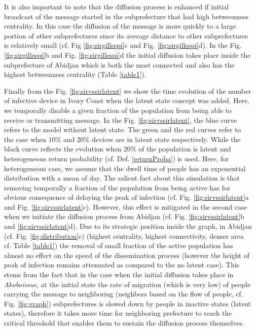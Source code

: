 \documentclass[review]{elsarticle}
\begin{document}
It is also important to note that the diffusion process is enhanced if initial broadcast of the message started in the subprefecture that had high betweenness centrality. In this case the diffusion of the message is more quickly to a large portion of other subprefectures since its average distance to other subprefectures is relatively small (cf. Fig \ref{fig:sirgillespi}c and Fig. \ref{fig:sirgillespi}d). In the Fig. \ref{fig:sirgillespi}b and Fig. \ref{fig:sirgillespi}d the initial diffusion takes place inside the subprefecture of Abidjan which is both the most connected and also has the highest betweenness centrality (Table \ref{table1}).  

Finally from the Fig. \ref{fig:sirvssirlatent} we show the time evolution of the number of infective device in Ivory Coast when the latent state concept was added. Here, we temporally disable a given fraction of the population from being able to receive or transmitting message. In the Fig. \ref{fig:sirvssirlatent}, the blue curve refers to the model without latent state. The green and the red curves refer to the case when 10\% and 20\% devices are in latent state respectively. While the black curve reflects the evolution when 20\% of the population is latent and heterogeneous return probability (cf. Def. \ref{returnProba}) is used. Here, for heterogeneous case, we assume that the dwell time of people has an exponential distribution with a mean of  day. The salient fact about this simulation is that removing temporally a fraction of the population from being active has for obvious consequence of delaying the peak of infection (cf. Fig. \ref{fig:sirvssirlatent}a and Fig. \ref{fig:sirvssirlatent}c). However, this effect is mitigated in the second case when we initiate the diffusion process from Abidjan (cf. Fig. \ref{fig:sirvssirlatent}b and \ref{fig:sirvssirlatent}d). Due to its strategic position inside the graph, in Abidjan (cf. Fig. \ref{fig:distribution}c) (highest centrality, highest connectivity, denser area cf. Table \ref{table1}) the removal of small fraction of the active population has almost no effect on the speed of the dissemination process (however the height of peak of infection remains attenuated as compared to the no latent case). This stems from the fact that in the case when the initial diffusion takes place in \textit{Akoboissue}, at the initial state the rate of migration (which is very low) of people carrying the message to neighboring (neighbors based on the flow of people, cf. Fig. \ref{fig:graph}) subprefectures is slowed down by people in inactive states (latent states), therefore it takes more time for neighboring prefecture to reach the critical threshold that enables them to sustain the diffusion process themselves.
\end{document}
